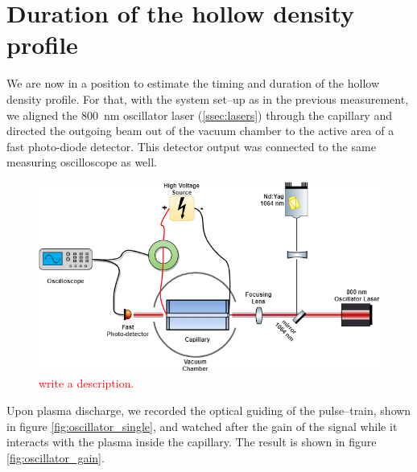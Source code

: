 \documentclass[../main.tex]{subfiles}
\begin{document}
\section{Duration of the hollow density profile}\label{sec:duration-of-guiding}
We are now in a position to estimate the timing and duration of the hollow density profile. For that, with the system set--up as in the previous measurement, we aligned the \SI{800}{\nm} oscillator laser (\ref{ssec:lasers}) through the capillary and directed the outgoing beam out of the vacuum chamber to the active area of a fast photo-diode detector. This detector output was connected to the same measuring oscilloscope as well.

\begin{figure}
\centering \includegraphics[width=\textwidth]{figures/oscillator.png}
\caption{\textcolor{red}{write a description.}}
\label{fig:oscillator}
\end{figure}
Upon plasma discharge, we recorded the optical guiding of the pulse--train, shown in figure  \ref{fig:oscillator_single}, and watched after the gain of the signal while it interacts with the plasma inside the capillary. The result is shown in figure \ref{fig:oscillator_gain}.
\end{document}
